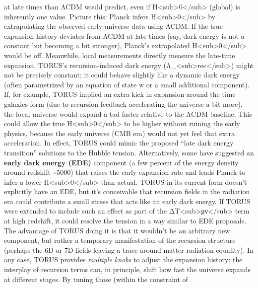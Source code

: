 \begin{enumerate}
  at late times than ΛCDM would predict, even if
  H\textless{}sub\textgreater{}0\textless{}/sub\textgreater{} (global)
  is inherently one value. Picture this: Planck infers
  H\textless{}sub\textgreater{}0\textless{}/sub\textgreater{} by
  extrapolating the observed early-universe data using ΛCDM. If the true
  expansion history deviates from ΛCDM at late times (say, dark energy
  is not a constant but becoming a bit stronger), Planck's extrapolated
  H\textless{}sub\textgreater{}0\textless{}/sub\textgreater{} would be
  off. Meanwhile, local measurements directly measure the late-time
  expansion. TORUS's recursion-induced dark energy
  (Λ\_\textless{}sub\textgreater{}rec\textless{}/sub\textgreater{})
  might not be precisely constant; it could behave slightly like a
  dynamic dark energy (often parametrized by an equation of state w or a
  small additional component). If, for example, TORUS implied an extra
  kick in expansion around the time galaxies form (due to recursion
  feedback accelerating the universe a bit more), the local universe
  would expand a tad faster relative to the ΛCDM baseline. This could
  allow the true
  H\textless{}sub\textgreater{}0\textless{}/sub\textgreater{} to be
  higher without ruining the early physics, because the early universe
  (CMB era) would not yet feel that extra acceleration. In effect, TORUS
  could mimic the proposed ``late dark energy transition'' solutions to
  the Hubble tension. Alternatively, some have suggested an
  \textbf{early dark energy (EDE)} component (a few percent of the
  energy density around redshift \textasciitilde{}5000) that raises the
  early expansion rate and leads Planck to infer a lower
  H\textless{}sub\textgreater{}0\textless{}/sub\textgreater{} than
  actual. TORUS in its current form doesn't explicitly have an EDE, but
  it's conceivable that recursion fields in the radiation era could
  contribute a small stress that acts like an early dark energy. If
  TORUS were extended to include such an effect as part of the
  ΔT\textless{}sub\textgreater{}μν\textless{}/sub\textgreater{} term at
  high redshift, it could resolve the tension in a way similar to EDE
  proposals​. The advantage of TORUS doing it is that it wouldn't be an
  arbitrary new component, but rather a temporary manifestation of the
  recursion structure (perhaps the 6D or 7D fields leaving a trace
  around matter-radiation equality). In any case, TORUS provides
  \emph{multiple knobs} to adjust the expansion history: the interplay
  of recursion terms can, in principle, shift how fast the universe
  expands at different stages. By tuning those (within the constraint of

\end{enumerate}

